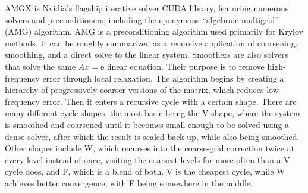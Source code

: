 AMGX is Nvidia's flagship iterative solver CUDA library, featuring numerous solvers and preconditioners, including the eponymous ``algebraic multigrid'' (AMG) algorithm.
AMG is a preconditioning algorithm used primarily for Krylov methods.
It can be roughly summarized as a recursive application of coarsening, smoothing, and a direct solve to the linear system.
Smoothers are also solvers that solve the same $Ax=b$ linear equation.
Their purpose is to remove high-frequency error through local relaxation.
The algorithm begins by creating a hierarchy of progressively coarser versions of the matrix, which reduces low-frequency error.
Then it enters a recursive cycle with a certain shape.
There are many different cycle shapes, the most basic being the V shape, where the system is smoothed and coarsened until it becomes small enough to be solved using a dense solver, after which the result is scaled back up, while also being smoothed.
Other shapes include W, which recurses into the coarse-grid correction twice at every level instead of once, visiting the coarsest levels far more often than a V cycle does, and F, which is a blend of both.
V is the cheapest cycle, while W achieves better convergence, with F being somewhere in the middle.
